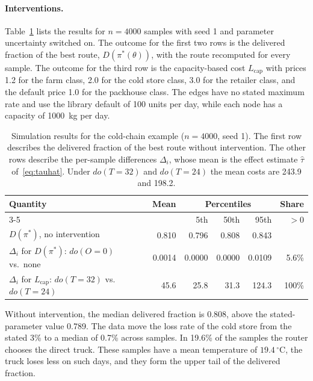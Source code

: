 \documentclass[12pt]{article}
\theoremstyle{plain}
\theoremstyle{definition}
\begin{document}
\paragraph{Interventions.}
Table~\ref{tab:effects} lists the results for $n=4000$ samples with seed 1 and parameter uncertainty switched on. The outcome for the first two rows is the delivered fraction of the best route, $D(\pi^*(\theta))$, with the route recomputed for every sample. The outcome for the third row is the capacity-based cost $L_{\mathrm{cap}}$ with prices 1.2 for the farm class, 2.0 for the cold store class, 3.0 for the retailer class, and the default price 1.0 for the packhouse class. The edges have no stated maximum rate and use the library default of 100 units per day, while each node has a capacity of 1000~kg per day.

\begin{table}[htbp]
\centering
\small
\setlength{\tabcolsep}{4pt}
\begin{tabular}{lrrrrr}
\toprule
Quantity & Mean & \multicolumn{3}{c}{Percentiles} & Share \\
\cmidrule(lr){3-5}
 & & 5th & 50th & 95th & $>0$ \\
\midrule
$D(\pi^*)$, no intervention & 0.810 & 0.796 & 0.808 & 0.843 & \\
$\Delta_i$ for $D(\pi^*)$: $do(O=0)$ vs.\ none & 0.0014 & 0.0000 & 0.0000 & 0.0109 & 5.6\% \\
$\Delta_i$ for $L_{\mathrm{cap}}$: $do(T=32)$ vs.\ $do(T=24)$ & 45.6 & 25.8 & 31.3 & 124.3 & 100\% \\
\bottomrule
\end{tabular}
\caption{Simulation results for the cold-chain example ($n=4000$, seed 1). The first row describes the delivered fraction of the best route without intervention. The other rows describe the per-sample differences $\Delta_i$, whose mean is the effect estimate $\hat\tau$ of~\eqref{eq:tauhat}. Under $do(T=32)$ and $do(T=24)$ the mean costs are 243.9 and 198.2.}
\label{tab:effects}
\end{table}

Without intervention, the median delivered fraction is 0.808, above the stated-parameter value 0.789. The data move the loss rate of the cold store from the stated 3\% to a median of 0.7\% across samples. In 19.6\% of the samples the router chooses the direct truck. These samples have a mean temperature of $19.4\,^\circ$C, the truck loses less on such days, and they form the upper tail of the delivered fraction.
\end{document}
